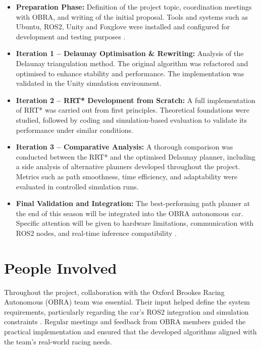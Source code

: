 \documentclass[a4paper,11pt]{report}
\begin{document}
\begin{itemize}
    \item \textbf{Preparation Phase:} Definition of the project topic, coordination meetings with OBRA, and writing of the initial proposal. Tools and systems such as Ubuntu, ROS2, Unity and Foxglove were installed and configured for development and testing purposes \cite{reference15, reference16, reference17, reference20}.
    
    \item \textbf{Iteration 1 – Delaunay Optimisation \& Rewriting:} Analysis of the Delaunay triangulation method. The original algorithm was refactored and optimised to enhance stability and performance. The implementation was validated in the Unity simulation environment.
    
    \item \textbf{Iteration 2 – RRT* Development from Scratch:} A full implementation of RRT* was carried out from first principles. Theoretical foundations were studied, followed by coding and simulation-based evaluation to validate its performance under similar conditions.
    
    \item \textbf{Iteration 3 – Comparative Analysis:} A thorough comparison was conducted between the RRT* and the optimised Delaunay planner, including a side analysis of alternative planners developed throughout the project. Metrics such as path smoothness, time efficiency, and adaptability were evaluated in controlled simulation runs.
    
    \item \textbf{Final Validation and Integration:} The best-performing path planner at the end of this season will be integrated into the OBRA autonomous car. Specific attention will be given to hardware limitations, communication with ROS2 nodes, and real-time inference compatibility \cite{reference15, reference16}.
\end{itemize}

\section{People Involved}
Throughout the project, collaboration with the Oxford Brookes Racing Autonomous (OBRA) team was essential. 
Their input helped define the system requirements, particularly regarding the car's ROS2 integration and simulation constraints \cite{reference16}. 
Regular meetings and feedback from OBRA members guided the practical implementation and ensured that the developed algorithms aligned with the team's real-world racing needs.
\end{document}
